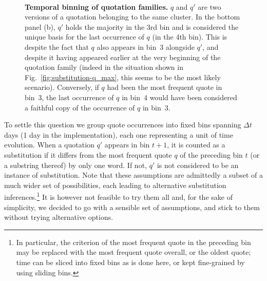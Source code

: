 \begin{figure}[h]
    \centering
	\hfill \\
	\caption{{\bf Temporal binning of quotation families.} $q$ and $q'$ are two versions of a quotation belonging to the same cluster.  In the bottom panel (b), $q'$ holds the majority in the 3rd bin and is considered the unique basis for the last occurrence of $q$ (in the 4th bin). This is despite the fact that $q$ also appears in bin~3 alongside $q'$, and despite it having appeared earlier at the very beginning of the quotation family (indeed in the situation shown in Fig.~\ref{fig:substitution-q_max}, this seems to be the most likely scenario). Conversely, if $q$ had been the most frequent quote in bin~3, the last occurrence of $q$ in bin~4 would have been considered a faithful copy of the occurrence of $q$ in bin~3.}
    \label{fig:substitution-temporal-binning}
\end{figure}

To settle this question we group quote occurrences into fixed bins spanning $\Delta t$ days (1 day in the implementation), each one representing a unit of time evolution.
When a quotation $q'$ appears in bin $t+1$, it is counted as a substitution if it differs from the most frequent quote $q$ of the preceding bin $t$ (or a substring thereof) by only one word. If not, $q'$ is not considered to be an instance of substitution.  %
Note that these assumptions are admittedly a subset of a much wider set of possibilities, each leading to alternative substitution inferences.\footnote{In particular, the criterion of the most frequent quote in the preceding bin may be replaced with the most frequent quote overall, or the oldest quote; time can be sliced into fixed bins as is done here, or kept fine-grained by using sliding bins.}
It is however not feasible to try them all and, for the sake of simplicity, we decided to go with a sensible set of assumptions, and stick to them without trying alternative options.

